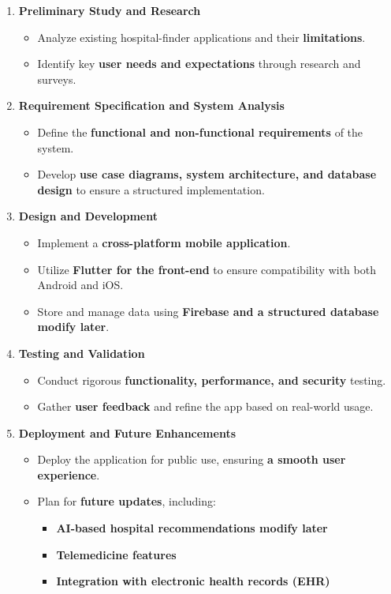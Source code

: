 \documentclass[12pt]{report}
\begin{document}
\begin{enumerate}
    \item \textbf{Preliminary Study and Research}
    \begin{itemize}
        \item Analyze existing hospital-finder applications and their \textbf{limitations}.
        \item Identify key \textbf{user needs and expectations} through research and surveys.
    \end{itemize}

    \item \textbf{Requirement Specification and System Analysis}
    \begin{itemize}
        \item Define the \textbf{functional and non-functional requirements} of the system.
        \item Develop \textbf{use case diagrams, system architecture, and database design} to ensure a structured implementation.
    \end{itemize}

    \item \textbf{Design and Development}
    \begin{itemize}
        \item Implement a \textbf{cross-platform mobile application}.
        \item Utilize \textbf{Flutter for the front-end} to ensure compatibility with both Android and iOS.
        \item Store and manage data using \textbf{Firebase and a structured database modify later}.
    \end{itemize}

    \item \textbf{Testing and Validation}
    \begin{itemize}
        \item Conduct rigorous \textbf{functionality, performance, and security} testing.
        \item Gather \textbf{user feedback} and refine the app based on real-world usage.
    \end{itemize}

    \item \textbf{Deployment and Future Enhancements}
    \begin{itemize}
        \item Deploy the application for public use, ensuring \textbf{a smooth user experience}.
        \item Plan for \textbf{future updates}, including:
        \begin{itemize}
            \item \textbf{AI-based hospital recommendations modify later}
            \item \textbf{Telemedicine features}
            \item \textbf{Integration with electronic health records (EHR)}
        \end{itemize}
    \end{itemize}
\end{enumerate}
\end{document}
